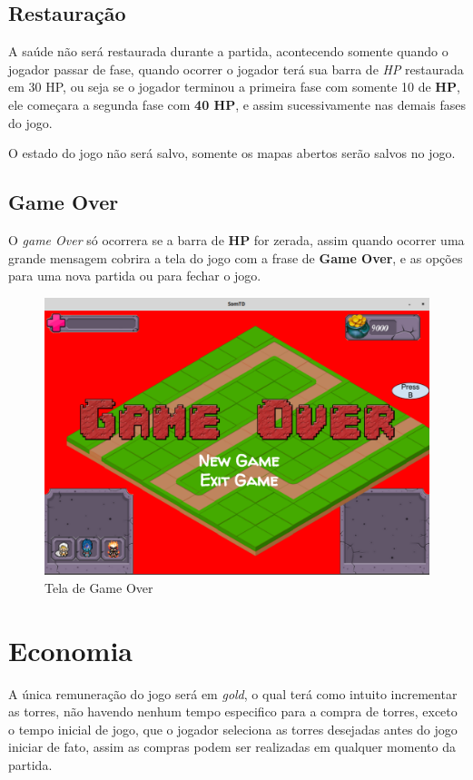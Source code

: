 \documentclass[11pt]{article} %
\begin{document}
\subsection{Restauração}
A saúde não será restaurada durante a partida, acontecendo somente quando o jogador passar de fase, quando ocorrer o jogador terá sua barra de \textit{HP} restaurada em 30 HP, ou seja se o jogador terminou a primeira fase com somente 10 de \textbf{HP}, ele começara a segunda fase com \textbf{40 HP}, e assim sucessivamente nas demais fases do jogo.  

O estado do jogo não será salvo, somente os mapas abertos serão salvos no jogo.

\subsection{Game Over}
O \textit{game Over} só ocorrera se a barra de \textbf{HP} for zerada, assim quando ocorrer uma grande mensagem cobrira a tela do jogo com a frase de \textbf{Game Over}, e as opções para uma nova partida ou para fechar o jogo.

\begin{figure}[!htp]
\centering
\includegraphics[scale=0.3]{res/game_over.png}
\caption{Tela de Game Over}
\label{Game Over}
\end{figure}
\newpage

\section{Economia}

A única remuneração do jogo será em \textit{gold}, o qual terá como intuito incrementar as torres, não havendo nenhum tempo especifico para a compra de torres, exceto o tempo inicial de jogo, que o jogador seleciona as torres desejadas antes do jogo iniciar de fato, assim as compras podem ser realizadas em qualquer momento da partida.
\end{document}
